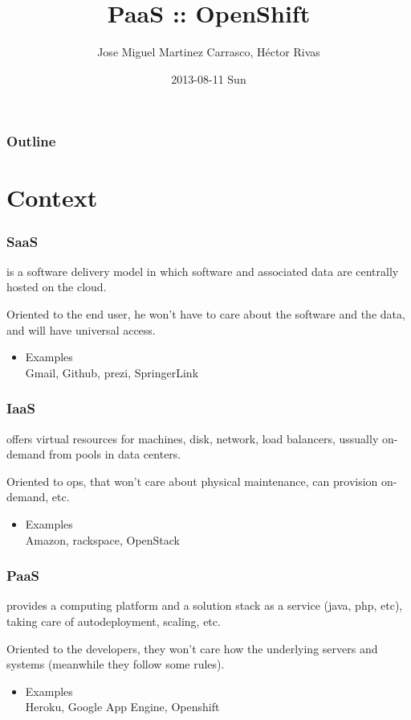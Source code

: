 \documentclass[bigger]{beamer}
\title{PaaS :: OpenShift}
\author{Jose Miguel Martinez Carrasco, Héctor Rivas}
\date{2013-08-11 Sun}
\begin{document}
\maketitle

\begin{frame}
\frametitle{Outline}
\setcounter{tocdepth}{3}
\tableofcontents
\end{frame}

\section{Context}
\label{sec-1}
\begin{frame}
\frametitle{SaaS}
\label{sec-1-1}


is a software delivery model in which software and associated data are centrally hosted on the cloud. 

Oriented to the end user, he won't have to care about the software and the data, and will have universal access.
\begin{itemize}

\item Examples\\
\label{sec-1-1-1}%
Gmail, Github, prezi, SpringerLink

\end{itemize} %
\end{frame}
\begin{frame}
\frametitle{IaaS}
\label{sec-1-2}


offers virtual resources for machines, disk, network, load balancers, ussually on-demand from pools in data centers.

Oriented to ops, that won't care about physical maintenance, can provision on-demand, etc.
\begin{itemize}

\item Examples\\
\label{sec-1-2-1}%
Amazon, rackspace, OpenStack

\end{itemize} %
\end{frame}
\begin{frame}
\frametitle{PaaS}
\label{sec-1-3}


provides a computing platform and a solution stack as a service (java, php, etc), taking care of autodeployment, scaling, etc.

Oriented to the developers, they won't care how the underlying servers and systems (meanwhile they follow some rules).
\begin{itemize}

\item Examples\\
\label{sec-1-3-1}%
Heroku, Google App Engine, Openshift

\end{itemize} %
\end{frame}
\end{document}
